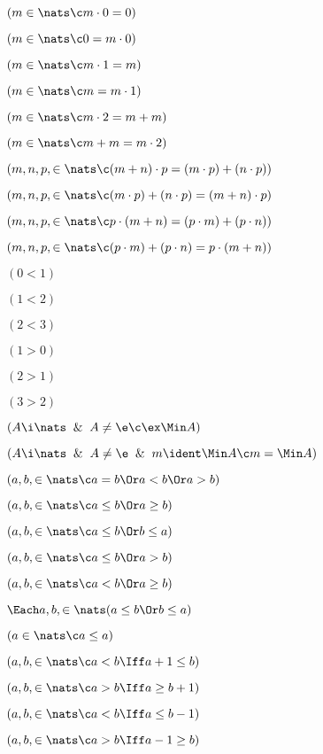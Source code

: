  $(m \in \nats \c m \cdot 0 = 0)$

 $(m \in \nats \c 0 = m \cdot 0)$

 $(m \in \nats \c m \cdot 1 = m)$

 $(m \in \nats \c m = m \cdot 1)$

 $(m \in \nats \c m \cdot 2 = m + m)$

 $(m \in \nats \c m + m = m \cdot 2)$

 $(m,n,p, \in \nats \c (m + n) \cdot p = (m \cdot p) + (n \cdot p))$

 $(m,n,p, \in \nats \c (m \cdot p) + (n \cdot p) =  (m + n) \cdot p )$

 $(m,n,p, \in \nats \c p \cdot (m + n)  = (p \cdot m) + (p \cdot n))$

 $(m,n,p, \in \nats \c (p \cdot m) + (p \cdot n) =  p \cdot (m + n))$

 $(0 < 1)$

 $(1 < 2)$

 $(2 < 3)$

 $(1 > 0)$

 $(2 > 1)$

 $(3 > 2)$

 $(A \i \nats \And A \ne \e \c \ex \Min A)$

 $(A \i \nats \And A \ne \e \And m \ident \Min A \c m = \Min A)$

 $(a,b,\in\nats \c a=b \Or a< b\Or a>b)$

 $(a,b,\in\nats \c  a\le  b\Or a\ge b)$

 $(a,b,\in\nats \c a \le b \Or b \le a)$

 $(a,b,\in\nats \c a \le b \Or a > b)$

 $(a,b,\in\nats \c a < b \Or  a \ge b)$

 $\Each a,b,\in\nats (a \le b \Or b \le a)$

 $(a \in \nats \c a \le a)$

 $(a,b,\in \nats \c a < b \Iff a+1 \le b)$

 $(a,b,\in \nats \c a > b \Iff a \ge b + 1)$

 $(a,b,\in \nats \c a < b \Iff a \le b -1)$

 $(a,b,\in \nats \c a > b \Iff a -1 \ge b )$


